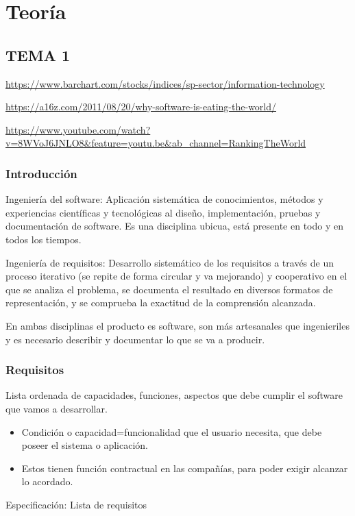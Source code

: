 \documentclass[12pt, twoside, openright]{report} %
\begin{document}
  
  
  
  
\part{Teoría}



\chapter{TEMA 1}

  \url{https://www.barchart.com/stocks/indices/sp-sector/information-technology}

  \url{https://a16z.com/2011/08/20/why-software-is-eating-the-world/}

  \url{https://www.youtube.com/watch?v=8WVoJ6JNLO8\&feature=youtu.be\&ab_channel=RankingTheWorld}

\section{Introducción}

Ingeniería del software: Aplicación sistemática de conocimientos,
métodos y experiencias científicas y tecnológicas al diseño,
implementación, pruebas y documentación de software. Es una
disciplina ubicua, está presente en todo y en todos los tiempos.

Ingeniería de requisitos: Desarrollo sistemático de los requisitos a
través de un proceso iterativo (se repite de forma circular y va
mejorando) y cooperativo en el que se analiza el problema, se
documenta el resultado en diversos formatos de representación, y se
comprueba la exactitud de la comprensión alcanzada.

En ambas disciplinas el producto es software, son más artesanales
que ingenieriles y es necesario describir y documentar lo que se va
a producir.

	
\section{Requisitos}

Lista ordenada de capacidades, funciones, aspectos que debe cumplir el
software que vamos a desarrollar.

\begin{itemize}
  \item
    Condición o capacidad=funcionalidad que el usuario necesita, que
    debe poseer el sistema o aplicación.
  \item
    Estos tienen función contractual en las compañías, para poder exigir
    alcanzar lo acordado.
\end{itemize}
Especificación: Lista de requisitos
\end{document}
